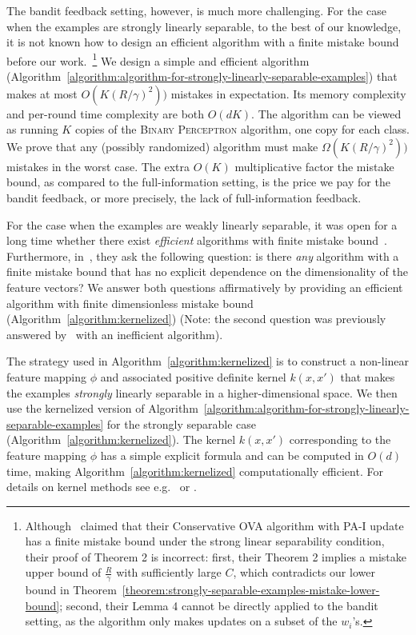 The bandit feedback setting, however, is much more challenging. For the case
when the examples are strongly linearly separable, to the best of our knowledge,
it is not known how to design an efficient algorithm with a finite mistake bound
before our work.~\footnote{Although~\cite{Chen-Chen-Zhang-Chen-Zhang-2009}
claimed that their Conservative OVA algorithm with PA-I update has a finite
mistake bound under the strong linear separability condition, their proof of
Theorem 2 is incorrect: first, their Theorem 2
implies a mistake upper bound of $\frac{R}{\gamma}$ with
sufficiently large $C$, which contradicts our lower
bound in Theorem~\ref{theorem:strongly-separable-examples-mistake-lower-bound};
second, their Lemma 4 cannot be directly applied to the bandit
setting, as the algorithm only makes updates on a subset of the $w_i$'s.} We
design a simple and efficient algorithm
(Algorithm~\ref{algorithm:algorithm-for-strongly-linearly-separable-examples})
that makes at most $O(K (R/\gamma)^2))$ mistakes in expectation. Its memory
complexity and per-round time complexity are both $O(dK)$. The algorithm can be
viewed as running $K$ copies of the \textsc{Binary Perceptron} algorithm, one
copy for each class. We prove that any (possibly randomized) algorithm must make
$\Omega(K (R/\gamma)^2))$ mistakes in the worst case. The extra $O(K)$
multiplicative factor the mistake bound, as compared to the full-information
setting, is the price we pay for the bandit feedback, or more precisely, the
lack of full-information feedback.

For the case when the examples are weakly linearly separable, it was open for a long 
time whether there exist \textit{efficient} algorithms with finite mistake 
bound~\cite{Kakade-Shalev-Shwartz-Tewari-2008, Beygelzimer-Orabona-Zhang-2017}. 
Furthermore, in~\cite{Kakade-Shalev-Shwartz-Tewari-2008}, they ask the following question:
is there \textit{any} algorithm with a finite mistake bound that has no explicit dependence 
on the dimensionality of the feature vectors? We answer both questions affirmatively by
providing an efficient algorithm with finite dimensionless mistake bound 
(Algorithm~\ref{algorithm:kernelized}) (Note: the second question was previously 
answered by~\cite{Daniely-Helbertal-2013} with an inefficient algorithm). 

The strategy used in Algorithm~\ref{algorithm:kernelized} is to construct a
non-linear feature mapping $\phi$ and associated positive definite kernel
$k(x,x')$ that makes the examples \emph{strongly} linearly separable in a higher-dimensional space. 
We then use the kernelized version of
Algorithm~\ref{algorithm:algorithm-for-strongly-linearly-separable-examples} for
the strongly separable case (Algorithm~\ref{algorithm:kernelized}). The kernel
$k(x,x')$ corresponding to the feature mapping $\phi$ has a simple explicit
formula and can be computed in $O(d)$ time, making
Algorithm~\ref{algorithm:kernelized} computationally efficient. For details on
kernel methods see e.g.~\citet{Scholkopf-Smola-2002} or
\citet{Shawe-Taylor-Cristianini-2004}.

